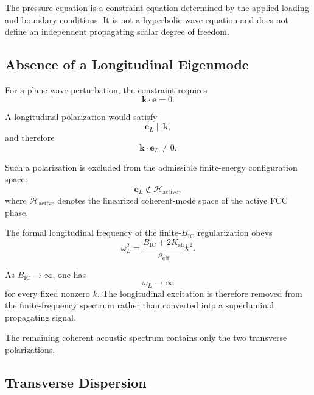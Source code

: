 The pressure equation is a constraint equation determined by the applied loading and boundary conditions. It is not a hyperbolic wave equation and does not define an independent propagating scalar degree of freedom.

\subsection{Absence of a Longitudinal Eigenmode}

For a plane-wave perturbation, the constraint requires
\begin{equation}
    \mathbf{k}\cdot\mathbf{e} = 0.
\end{equation}

A longitudinal polarization would satisfy
\begin{equation}
    \mathbf{e}_L \parallel \mathbf{k},
\end{equation}
and therefore
\begin{equation}
    \mathbf{k}\cdot\mathbf{e}_L \neq 0.
\end{equation}

Such a polarization is excluded from the admissible finite-energy configuration space:
\begin{equation}
    \boxed{ \mathbf{e}_L \notin \mathcal{H}_{\mathrm{active}} },
\end{equation}
where $\mathcal{H}_{\mathrm{active}}$ denotes the linearized coherent-mode space of the active FCC phase.

The formal longitudinal frequency of the finite-$B_{\mathrm{IC}}$ regularization obeys
\begin{equation}
    \omega_L^2 = \frac{ B_{\mathrm{IC}} + 2K_{\mathrm{sh}} }{ \rho_{\mathrm{eff}} } k^2.
\end{equation}

As $B_{\mathrm{IC}} \rightarrow \infty$, one has
\begin{equation}
    \omega_L \rightarrow \infty
\end{equation}
for every fixed nonzero $k$. The longitudinal excitation is therefore removed from the finite-frequency spectrum rather than converted into a superluminal propagating signal.

The remaining coherent acoustic spectrum contains only the two transverse polarizations.

\subsection{Transverse Dispersion}

